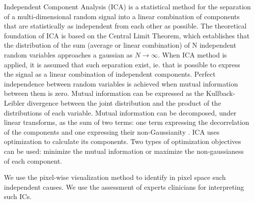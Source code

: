 Independent Component Analysis (ICA) \citep{hyvarinen2000independent} is a statistical method for the separation of a multi-dimensional random signal into a linear combination of components that are statistically as independent from each other as possible. The theoretical foundation of ICA is based on the Central Limit Theorem, which establishes that the distribution of the sum (average or linear combination) of N independent random variables approaches a gaussian as $N \rightarrow \infty$. When ICA method is applied, it is assumed that such separation exist, ie. that is possible to express the signal as a linear combination of independent components. Perfect independence between random variables is achieved when mutual information between them is zero. Mutual information can be expressed as the Kullback-Leibler divergence between the joint distribution and the product of the distributions of each variable. Mutual information can be decomposed, under linear transforms, as the sum of two terms: one term expressing the decorrelation of the components and one expressing their non-Gaussianity \citep{cardoso2003dependence}. ICA uses optimization to calculate its components. Two types of optimization objectives can be used: minimize the mutual information or maximize the non-gaussianess of each component. 

We use the pixel-wise visualization method to identify in pixel space such independent causes. We use the assessment of experts clinicians for interpreting such ICs.





